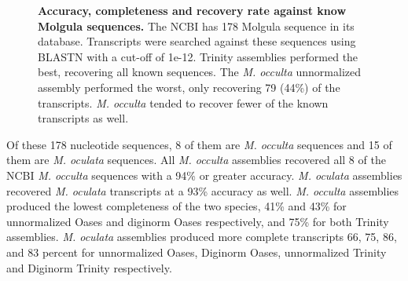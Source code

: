 \begin{figure}[!ht]
	\hfill
	\caption{\textbf{Accuracy, completeness and recovery rate against know Molgula sequences.} The NCBI has 178 Molgula sequence in its database. Transcripts were searched against these sequences using BLASTN with a cut-off of 1e-12. Trinity assemblies performed the best, recovering all known sequences. The \textit{M. occulta} unnormalized assembly performed the worst, only recovering 79 (44\%) of the transcripts. \textit{M. occulta} tended to recover fewer of the known transcripts as well.}
	\label{fig:known_molg}
\end{figure}
     
Of these 178 nucleotide sequences, 8 of them are \textit{M. occulta} sequences and 15 of them are \textit{M. oculata} sequences. All \textit{M. occulta} assemblies recovered all 8 of the NCBI \textit{M. occulta} sequences with a 94\% or greater accuracy. \textit{M. oculata} assemblies recovered \textit{M. oculata} transcripts at a 93\% accuracy as well. \textit{M. occulta} assemblies produced the lowest completeness of the two species, 41\% and 43\% for unnormalized Oases and diginorm Oases respectively, and 75\% for both Trinity assemblies. \textit{M. oculata} assemblies produced more complete transcripts 66, 75, 86, and 83 percent for unnormalized Oases, Diginorm Oases, unnormalized Trinity and Diginorm Trinity respectively.


